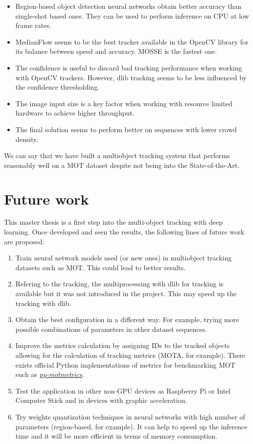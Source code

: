 \begin{itemize}
    \item Region-based object detection neural networks obtain better accuracy than single-shot based ones. They can be used to perform inference on CPU at low frame rates.
    \item MedianFlow seems to be the best tracker available in the OpenCV library for its balance between speed and accuracy. MOSSE is the fastest one.
    \item The confidence is useful to discard bad tracking performance when working with OpenCV trackers. However, dlib tracking seems to be less influenced by the confidence thresholding.
    \item The image input size is a key factor when working with resource limited hardware to achieve higher throughput.
    \item The final solution seems to perform better on sequences with lower crowd density.
\end{itemize}
We can say that we have built a multiobject tracking system that performs reasonably well on a MOT dataset despite not being into the State-of-the-Art.
\section{Future work}
This master thesis is a first step into the multi-object tracking with deep learning. Once developed and seen the results, the following lines of future work are proposed:
\begin{enumerate}
    \item Train neural network models used (or new ones) in multiobject tracking datasets such as MOT. This could lead to better results.
    \item Refering to the tracking, the multiprocessing with dlib for tracking is available but it was not introduced in the project. This may speed up the tracking with dlib.
    \item Obtain the best configuration in a different way. For example, trying more possible combinations of parameters in other dataset sequences.
    \item Improve the metrics calculation by assigning IDs to the tracked objects allowing for the calculation of tracking metrics (MOTA, for example). There exists official Python implementations of metrics for benchmarking MOT such as \href{https://github.com/cheind/py-motmetrics}{\textit{py-motmetrics}}.
    \item Test the application in other non-GPU devices as Raspberry Pi or Intel Computer Stick and in devices with graphic acceleration.
    \item Try weights quantization techniques in neural networks with high number of parameters (region-based, for example). It can help to speed up the inference time and it will be more efficient in terms of memory consumption.
\end{enumerate}